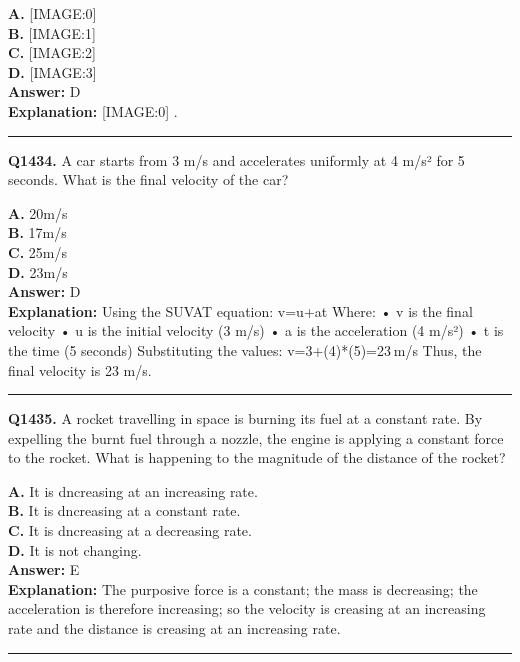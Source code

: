 \documentclass[12pt]{article}
\begin{document}
\textbf{A.} [IMAGE:0] \\
\textbf{B.} [IMAGE:1] \\
\textbf{C.} [IMAGE:2] \\
\textbf{D.} [IMAGE:3] \\

\textbf{Answer:} D \\
\textbf{Explanation:} [IMAGE:0]
.

\hrule
\vspace{1em}


\noindent
\textbf{Q1434.} A car starts from 3 m/s and accelerates uniformly at 4 m/s² for 5 seconds. What is the final velocity of the car?



\textbf{A.} 20m/s \\
\textbf{B.} 17m/s \\
\textbf{C.} 25m/s \\
\textbf{D.} 23m/s \\

\textbf{Answer:} D \\
\textbf{Explanation:} Using the SUVAT equation: v=u+at
Where:
• v is the final velocity
• u is the initial velocity (3 m/s)
• a is the acceleration (4 m/s²)
• t is the time (5 seconds)
Substituting the values: v=3+(4)*(5)=23 m/s Thus, the final velocity is 23 m/s.

\hrule
\vspace{1em}


\noindent
\textbf{Q1435.} A rocket travelling in space is burning its fuel at a constant rate. By expelling the burnt fuel through a nozzle, the engine is applying a constant force to the rocket.
What is happening to the magnitude of the distance of the rocket?



\textbf{A.} It is dncreasing at an increasing rate. \\
\textbf{B.} It is dncreasing at a constant rate. \\
\textbf{C.} It is dncreasing at a decreasing rate. \\
\textbf{D.} It is not changing. \\

\textbf{Answer:} E \\
\textbf{Explanation:} The purposive force is a constant; the mass is decreasing; the acceleration is therefore increasing; so the velocity is creasing at an increasing rate and the distance is creasing at an increasing rate.

\hrule
\vspace{1em}
\end{document}
